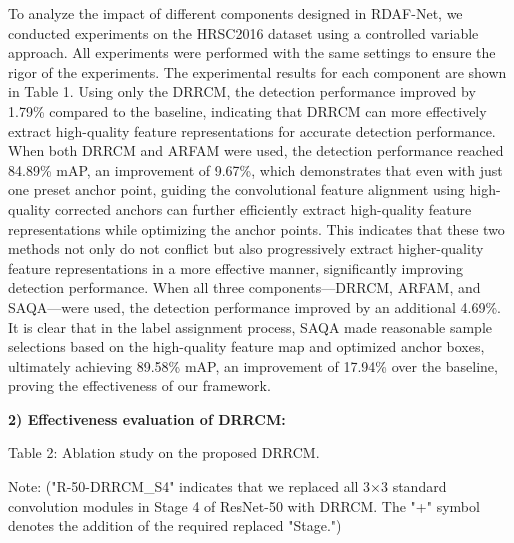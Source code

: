 \documentclass[10pt,twocolumn,final]{article}
\begin{document}
To analyze the impact of different components designed in RDAF-Net, we conducted experiments on the HRSC2016 dataset using a controlled variable approach. All experiments were performed with the same settings to ensure the rigor of the experiments. The experimental results for each component are shown in Table 1. Using only the DRRCM, the detection performance improved by 1.79\% compared to the baseline, indicating that DRRCM can more effectively extract high-quality feature representations for accurate detection performance. When both DRRCM and ARFAM were used, the detection performance reached 84.89\% mAP, an improvement of 9.67\%, which demonstrates that even with just one preset anchor point, guiding the convolutional feature alignment using high-quality corrected anchors can further efficiently extract high-quality feature representations while optimizing the anchor points. This indicates that these two methods not only do not conflict but also progressively extract higher-quality feature representations in a more effective manner, significantly improving detection performance. When all three components—DRRCM, ARFAM, and SAQA—were used, the detection performance improved by an additional 4.69\%. It is clear that in the label assignment process, SAQA made reasonable sample selections based on the high-quality feature map and optimized anchor boxes, ultimately achieving 89.58\% mAP, an improvement of 17.94\% over the baseline, proving the effectiveness of our framework.

\textbf{2) Effectiveness evaluation of DRRCM:}

Table 2: Ablation study on the proposed DRRCM.

Note: ("R-50-DRRCM\_S4" indicates that we replaced all 3×3 standard convolution modules in Stage 4 of ResNet-50 with DRRCM. The "+" symbol denotes the addition of the required replaced "Stage.")
\end{document}
